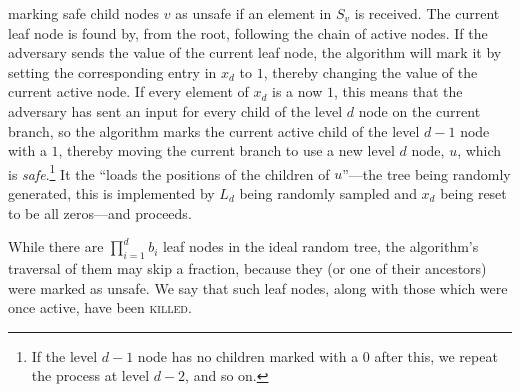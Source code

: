 \documentclass[10pt,a4paper]{article}
\theoremstyle{definition}
\theoremstyle{remark}
\newcommand{\ceil}[1]{{\left\lceil{#1}\right\rceil}}
\newcommand{\floor}[1]{{\left\lfloor{#1}\right\rfloor}}
\newcommand{\mif}{\textsc{mif}\xspace}
\newcommand{\rl}{\mathbf{\ell}}             %
\begin{document}
\begin{itemize}
\begin{itemize}
marking safe child nodes $v$ as unsafe if an element in $S_v$ is received. The
current leaf node is found by, from the root, following the chain of active
nodes. If the adversary sends the value of the current leaf node, the
algorithm will mark it by setting the corresponding entry in $x_d$ to $1$,
thereby changing the value of the current active node. If every element of
$x_d$ is a now $1$, this means that the adversary has sent an input for every
child of the level $d$ node on the current branch, so the algorithm marks the
current active child of the level $d - 1$ node with a $1$, thereby moving the
current branch to use a new level $d$ node, $u$, which is
\emph{safe}.\footnote{If the level $d - 1$ node has no children marked with a
$0$ after this, we repeat the process at level $d -2$, and so on.} It the
``loads the positions of the children of $u$''---the tree being randomly
generated, this is implemented by $L_d$ being randomly sampled and $x_d$ being
reset to be all zeros---and proceeds.

While there are $\prod_{i=1}^{d} b_i$ leaf nodes in the ideal random tree, the algorithm's traversal of them may skip a fraction, because they (or one of their ancestors) were marked as unsafe. We say that such leaf nodes, along with those which were once active, have been \textsc{killed}.


\end{itemize}
\end{itemize}
\end{document}
